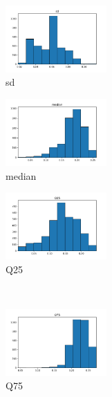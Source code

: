 \documentclass[a4paper]{article}    %
\begin{document}
\newpage

\begin{figure}[H]
    \centering
    \begin{subfigure}{0.32\textwidth}
        \centering
        \includegraphics[width=3.85cm]{raw_0_sd}
        \caption{sd}
        \label{fig:sub_raw_1}
    \end{subfigure}
    \hfill
    \begin{subfigure}{0.32\textwidth}
        \centering
        \includegraphics[width=3.85cm]{raw_1_median}
        \caption{median}
        \label{fig:sub_raw_2}
    \end{subfigure}
    \hfill
    \begin{subfigure}{0.32\textwidth}
        \centering
        \includegraphics[width=3.85cm]{raw_2_Q25}
        \caption{Q25}
        \label{fig:sub_raw_3}
    \end{subfigure}%
    \\
    \begin{subfigure}{0.32\textwidth}
        \centering
        \includegraphics[width=3.85cm]{raw_3_Q75}
        \caption{Q75}
        \label{fig:sub_raw_4}
    \end{subfigure}\hfill
    \begin{subfigure}{0.32\textwidth}
        \centering

\end{subfigure}
\end{figure}
\end{document}
